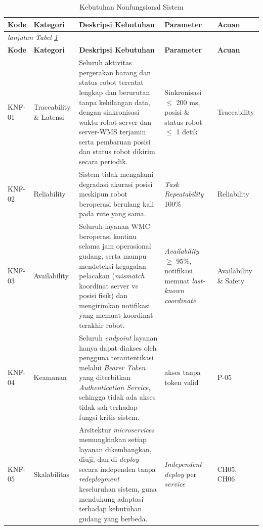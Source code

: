 \begin{longtable}{ | p{1.4cm} | p{2.0cm} | >{\raggedright\arraybackslash}p{5.0cm} | >{\raggedright\arraybackslash}p{2.4cm} | >{\raggedright\arraybackslash}p{2.0cm} | }
    \caption{Kebutuhan Nonfungsional Sistem} \label{tab:kebutuhan-nonfungsional} \\
    \hline
    \textbf{Kode} & \textbf{Kategori} & \textbf{Deskripsi Kebutuhan} & \textbf{Parameter} & \textbf{Acuan} \\
    \hline
    \endfirsthead
    \multicolumn{5}{l}{\textit{lanjutan Tabel \ref{tab:kebutuhan-nonfungsional}}} \\
    \hline
    \textbf{Kode} & \textbf{Kategori} & \textbf{Deskripsi Kebutuhan} & \textbf{Parameter} & \textbf{Acuan} \\
    \hline
    \endhead
    \hline
    \endfoot
    KNF-01 & Traceability \& Latensi & Seluruh aktivitas pergerakan barang dan status robot tercatat lengkap dan berurutan tanpa kehilangan data, dengan sinkronisasi waktu robot-server dan server-WMS terjamin serta pembaruan posisi dan status robot dikirim secara periodik. & Sinkronisasi $\leq$ 200 ms, posisi \& status robot $\leq$ 1 detik & Traceability \\
    \hline
    KNF-02 & Reliability & Sistem tidak mengalami degradasi akurasi posisi meskipun robot beroperasi berulang kali pada rute yang sama. & \textit{Task Repeatability} 100\% & Reliability \\
    \hline
    KNF-03 & Availability & Seluruh layanan WMC beroperasi kontinu selama jam operasional gudang, serta mampu mendeteksi kegagalan pelacakan (\textit{mismatch} koordinat server vs posisi fisik) dan mengirimkan notifikasi yang memuat koordinat terakhir robot. & \textit{Availability} $\geq$ 95\%, notifikasi memuat \textit{last-known coordinate} & Availability \& Safety \\
    \hline
    KNF-04 & Keamanan & Seluruh \textit{endpoint} layanan hanya dapat diakses oleh pengguna terautentikasi melalui \textit{Bearer Token} yang diterbitkan \textit{Authentication Service}, sehingga tidak ada akses tidak sah terhadap fungsi kritis sistem. & 0 akses tanpa token valid & P-05 \\
    \hline
    KNF-05 & Skalabilitas & Arsitektur \textit{microservices} memungkinkan setiap layanan dikembangkan, diuji, dan di-\textit{deploy} secara independen tanpa \textit{redeployment} keseluruhan sistem, guna mendukung adaptasi terhadap kebutuhan gudang yang berbeda. & \textit{Independent deploy} per \textit{service} & CH05, CH06 \\
    \hline
\end{longtable}

